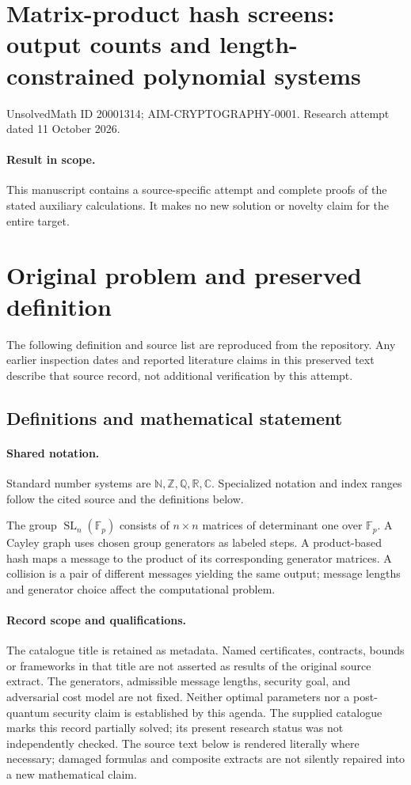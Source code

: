 \documentclass[11pt]{article}
\begin{document}
\section*{Matrix-product hash screens: output counts and length-constrained polynomial systems}
\noindent UnsolvedMath ID 20001314; AIM-CRYPTOGRAPHY-0001. Research attempt dated 11 October 2026.
\paragraph{Result in scope.}This manuscript contains a source-specific attempt and complete proofs of the stated auxiliary calculations. It makes no new solution or novelty claim for the entire target.
\section{Original problem and preserved definition}
The following definition and source list are reproduced from the repository. Any earlier inspection dates and reported literature claims in this preserved text describe that source record, not additional verification by this attempt.
\subsection{Definitions and mathematical statement}

\paragraph{Shared notation.}Standard number systems are $\mathbb N,\mathbb Z,\mathbb Q,\mathbb R,\mathbb C$. Specialized notation and index ranges follow the cited source and the definitions below.


The group $\operatorname{SL}_n(\mathbb F_p)$ consists of $n\times n$ matrices of determinant one over $\mathbb F_p$. A Cayley graph uses chosen group generators as labeled steps. A product-based hash maps a message to the product of its corresponding generator matrices. A collision is a pair of different messages yielding the same output; message lengths and generator choice affect the computational problem.
\paragraph{Record scope and qualifications.}
The catalogue title is retained as metadata. Named certificates, contracts, bounds or frameworks in that title are not asserted as results of the original source extract.
The generators, admissible message lengths, security goal, and adversarial cost model are not fixed. Neither optimal parameters nor a post-quantum security claim is established by this agenda. The supplied catalogue marks this record partially solved; its present research status was not independently checked.
The source text below is rendered literally where necessary; damaged formulas and composite extracts are not silently repaired into a new mathematical claim.
\end{document}
